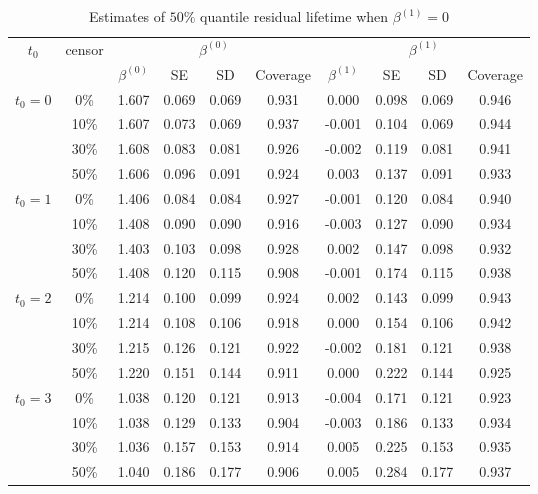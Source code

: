\documentclass[12pt]{article}
\begin{document}
	\begin{table}[H]
		\caption{Estimates of $50\%$ quantile residual lifetime when $\beta^{(1)}=0$}
		\centering
		\begin{tabular}{|c|c|c|c|c|c|c|c|c|c|}
			\hline
			\multirow{2}{*}{$t_0$} & \multirow{2}{*}{censor} & \multicolumn{4}{c|}{$\beta^{(0)}$} & \multicolumn{4}{c|}{$\beta^{(1)}$}\\ \cline{3-10}
			& & $\beta^{(0)}$ & SE & SD  & Coverage  & $\beta^{(1)}$ & SE & SD & Coverage\\
			\hline\hline
			\multirow{4}{*}{$t_0=0$} & 0\% & 1.607 & 0.069 & 0.069 & 0.931 & 0.000 & 0.098 & 0.069 & 0.946 \\
			& 10\% & 1.607 & 0.073 & 0.069 & 0.937 & -0.001 & 0.104 & 0.069 & 0.944 \\
			& 30\% & 1.608 & 0.083 & 0.081 & 0.926 & -0.002 & 0.119 & 0.081 & 0.941 \\
			& 50\% & 1.606 & 0.096 & 0.091 & 0.924 & 0.003 & 0.137 & 0.091 & 0.933 \\
			\hline
			\multirow{4}{*}{$t_0=1$} & 0\% & 1.406 & 0.084 & 0.084 & 0.927 & -0.001 & 0.120 & 0.084 & 0.940 \\
			& 10\% & 1.408 & 0.090 & 0.090 & 0.916 & -0.003 & 0.127 & 0.090 & 0.934 \\
			& 30\% & 1.403 & 0.103 & 0.098 & 0.928 & 0.002 & 0.147 & 0.098 & 0.932 \\
			& 50\% & 1.408 & 0.120 & 0.115 & 0.908 & -0.001 & 0.174 & 0.115 & 0.938 \\
			\hline
			\multirow{4}{*}{$t_0=2$} & 0\% & 1.214 & 0.100 & 0.099 & 0.924 & 0.002 & 0.143 & 0.099 & 0.943 \\
			& 10\% & 1.214 & 0.108 & 0.106 & 0.918 & 0.000 & 0.154 & 0.106 & 0.942 \\
			& 30\% & 1.215 & 0.126 & 0.121 & 0.922 & -0.002 & 0.181 & 0.121 & 0.938 \\
			& 50\% & 1.220 & 0.151 & 0.144 & 0.911 & 0.000 & 0.222 & 0.144 & 0.925 \\
			\hline
			\multirow{4}{*}{$t_0=3$} & 0\% & 1.038 & 0.120 & 0.121 & 0.913 & -0.004 & 0.171 & 0.121 & 0.923 \\
			& 10\% & 1.038 & 0.129 & 0.133 & 0.904 & -0.003 & 0.186 & 0.133 & 0.934 \\
			& 30\% & 1.036 & 0.157 & 0.153 & 0.914 & 0.005 & 0.225 & 0.153 & 0.935 \\
			& 50\% & 1.040 & 0.186 & 0.177 & 0.906 & 0.005 & 0.284 & 0.177 & 0.937 \\
			\hline
		\end{tabular}
	\end{table}
			
\end{document}
